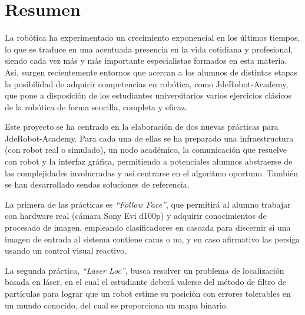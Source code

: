 \chapter*{Resumen}
\setlength{\parskip}{1ex}

La robótica ha experimentado un crecimiento exponencial en los últimos tiempos, lo que se traduce en una acentuada presencia en la vida cotidiana y profesional, siendo cada vez más y más importante especialistas formados en esta materia. Así, surgen recientemente entornos que acercan a los alumnos de distintas etapas la posibilidad de adquirir competencias en robótica, como JdeRobot-Academy, que pone a disposición de los estudiantes universitarios varios ejercicios clásicos de la robótica de forma sencilla, completa y eficaz.

Este proyecto se ha centrado en la elaboración de dos nuevas prácticas para JdeRobot-Academy. Para cada una de ellas se ha preparado una infraestructura (con robot real o simulado), un nodo académico, la comunicación que resuelve con robot y la interfaz gráfica, permitiendo a potenciales alumnos abstraerse de las complejidades involucradas y así centrarse en el algoritmo oportuno. También se han desarrollado sendas soluciones de referencia. 

La primera de las prácticas es \textit{``Follow Face''}, que permitirá al alumno trabajar con hardware real (cámara Sony Evi d100p) y adquirir conocimientos de procesado de imagen, empleando clasificadores en cascada para discernir si una imagen de entrada al sistema contiene caras o no, y en caso afirmativo las persiga usando un control visual reactivo.

La segunda práctica, \textit{``Laser Loc''}, busca resolver un problema de localización basada en láser, en el cual el estudiante deberá valerse del método de filtro de partículas para lograr que un robot estime su posición con errores tolerables en un mundo conocido, del cual se proporciona un mapa binario.